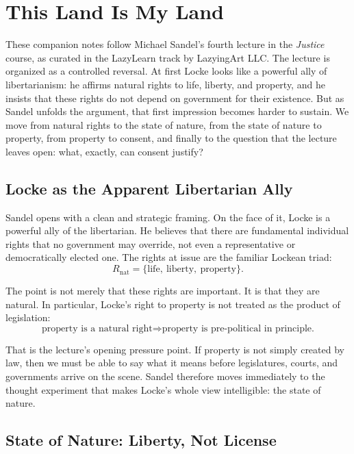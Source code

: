 \chapter{This Land Is My Land}

These companion notes follow Michael Sandel's fourth lecture in the \textit{Justice} course, as curated in the LazyLearn track by LazyingArt LLC. The lecture is organized as a controlled reversal. At first Locke looks like a powerful ally of libertarianism: he affirms natural rights to life, liberty, and property, and he insists that these rights do not depend on government for their existence. But as Sandel unfolds the argument, that first impression becomes harder to sustain. We move from natural rights to the state of nature, from the state of nature to property, from property to consent, and finally to the question that the lecture leaves open: what, exactly, can consent justify?

\section{Locke as the Apparent Libertarian Ally}

Sandel opens with a clean and strategic framing. On the face of it, Locke is a powerful ally of the libertarian. He believes that there are fundamental individual rights that no government may override, not even a representative or democratically elected one. The rights at issue are the familiar Lockean triad:
\begin{equation}
R_{\mathrm{nat}}=\{\text{life},\ \text{liberty},\ \text{property}\}.
\end{equation}

The point is not merely that these rights are important. It is that they are natural. In particular, Locke's right to property is not treated as the product of legislation:
\begin{equation}
\text{property is a natural right}
\Longrightarrow
\text{property is pre-political in principle.}
\end{equation}

That is the lecture's opening pressure point. If property is not simply created by law, then we must be able to say what it means before legislatures, courts, and governments arrive on the scene. Sandel therefore moves immediately to the thought experiment that makes Locke's whole view intelligible: the state of nature.

\section{State of Nature: Liberty, Not License}

